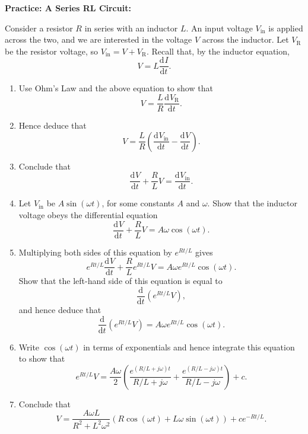 \documentclass{article}
\newcommand{\deriv}[3][]{\frac{\mathrm{d}^{#1}#2}{\mathrm{d}#3^{#1}}}
\begin{document}
\clearpage



\textbf{Practice: A Series RL Circuit:}\bigskip

Consider a resistor $R$ in series with an inductor $L$. An input voltage $V_\mathrm{in}$ is applied across the two, and we are interested in the voltage $V$ across the inductor. Let $V_\mathrm{R}$ be the resistor voltage, so $V_\mathrm{in}=V+V_\mathrm{R}$. Recall that, by the inductor equation,
\[V=L\deriv{I}{t}.\]

\begin{enumerate}
	\item Use Ohm's Law and the above equation to show that
		\[V=\frac{L}{R}\deriv{V_\mathrm{R}}{t}.\]
	\item Hence deduce that
		\[V=\frac{L}{R}\left(\deriv{V_\mathrm{in}}{t}-\deriv{V}{t}\right).\]
	\item Conclude that
		\[\deriv{V}{t} + \frac{R}{L}V = \deriv{V_\mathrm{in}}{t}.\]
	\item Let $V_\mathrm{in}$ be $A\sin(\omega t)$, for some constants $A$ and $\omega$. Show that the inductor voltage obeys the differential equation
		\[\deriv{V}{t}+\frac{R}{L}V = A\omega \cos(\omega t).\]
	\item Multiplying both sides of this equation by $e^{Rt/L}$ gives
		\[e^{Rt/L}\deriv{V}{t} + \frac{R}{L}e^{Rt/L}V = A\omega e^{Rt/L}\cos(\omega t).\]
		Show that the left-hand side of this equation is equal to
		\[\deriv{}{t}\left(e^{Rt/L}V\right),\]
		and hence deduce that
		\[\deriv{}{t}\left(e^{Rt/L}V\right)=A\omega e^{Rt/L}\cos(\omega t).\]
	\item Write $\cos(\omega t)$ in terms of exponentials and hence integrate this equation to show that
		\[e^{Rt/L}V=\frac{A\omega}{2}\left(\frac{e^{(R/L + j\omega)t}}{R/L + j\omega} + \frac{e^{(R/L - j\omega)t}}{R/L - j\omega}\right)+c.\]
	\item Conclude that
		\[V=\frac{A\omega L}{R^2 + L^2\omega^2}\left(R \cos(\omega t) +L\omega\sin(\omega t)\right)+ce^{-Rt/L}.\]
\end{enumerate}
\end{document}
